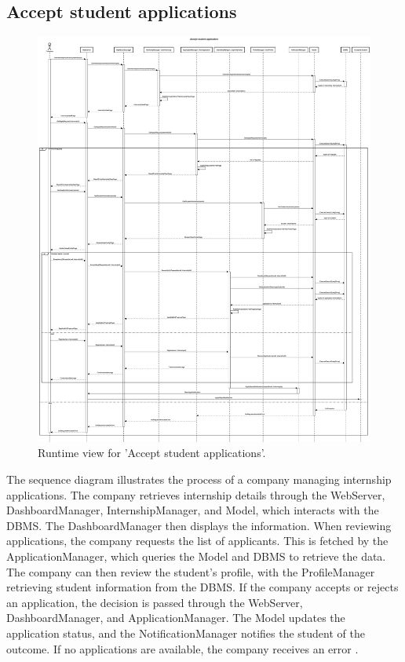 \subsection{Accept student applications}
\begin{figure}[H]
    \begin{center}
        \includegraphics[width=0.8\linewidth]{DD/LaTeX/Images/RuntimeView/AcceptSTApplication.png}
        \caption{Runtime view for 'Accept student applications'.}
        \label{fig:runtime_AcceptSTApplication}%
    \end{center}
\end{figure}

The sequence diagram illustrates the process of a company managing internship applications. The company retrieves internship details through the WebServer, DashboardManager, InternshipManager, and Model, which interacts with the DBMS. The DashboardManager then displays the information. When reviewing applications, the company requests the list of applicants. This is fetched by the ApplicationManager, which queries the Model and DBMS to retrieve the data. The company can then review the student’s profile, with the ProfileManager retrieving student information from the DBMS. If the company accepts or rejects an application, the decision is passed through the WebServer, DashboardManager, and ApplicationManager. The Model updates the application status, and the NotificationManager notifies the student of the outcome. If no applications are available, the company receives an error .

